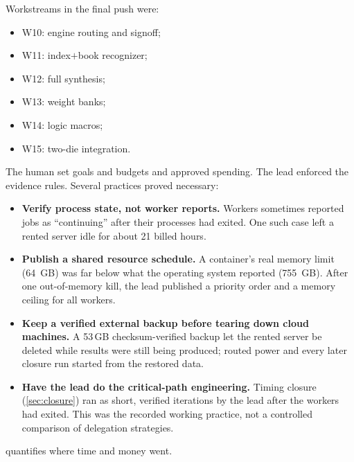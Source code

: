 Workstreams in the final push were:
\begin{itemize}
\item W10: engine routing and signoff;
\item W11: index$+$book recognizer;
\item W12: full synthesis;
\item W13: weight banks;
\item W14: logic macros;
\item W15: two-die integration.
\end{itemize}

The human set goals and budgets and approved spending. The lead enforced the evidence rules. Several practices proved necessary:
\begin{itemize}
\item \textbf{Verify process state, not worker reports.} Workers sometimes reported jobs as ``continuing'' after their processes had exited. One such case left a rented server idle for about 21 billed hours.
\item \textbf{Publish a shared resource schedule.} A container's real memory limit (\SI{64}{GB}) was far below what the operating system reported (\SI{755}{GB}). After one out-of-memory kill, the lead published a priority order and a memory ceiling for all workers.
\item \textbf{Keep a verified external backup before tearing down cloud machines.} A 53\,GB checksum-verified backup let the rented server be deleted while results were still being produced; routed power and every later closure run started from the restored data.
\item \textbf{Have the lead do the critical-path engineering.} Timing closure (\cref{sec:closure}) ran as short, verified iterations by the lead after the workers had exited. This was the recorded working practice, not a controlled comparison of delegation strategies.
\end{itemize}
 quantifies where time and money went.

